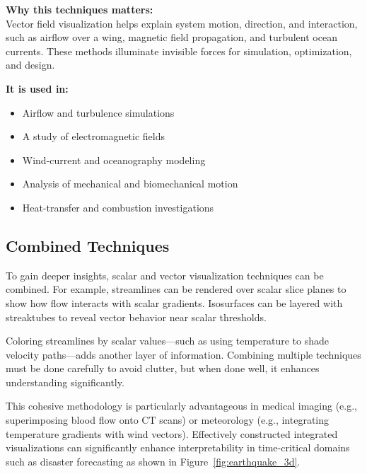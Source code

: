 \documentclass[11pt]{article}
\begin{document}
	
	\vspace{1em}
\noindent
\textbf{Why this techniques matters:} \\
Vector field visualization helps explain system motion, direction, and interaction, such as airflow over a wing, magnetic field propagation, and turbulent ocean currents. These methods illuminate invisible forces for simulation, optimization, and design.

\vspace{0.5em}
\noindent
\textbf{It is used in:}
\begin{itemize}
    \item Airflow and turbulence simulations
    \item A study of electromagnetic fields
    \item Wind-current and oceanography modeling
    \item Analysis of mechanical and biomechanical motion
    \item Heat-transfer and combustion investigations
\end{itemize}

	\subsection{Combined Techniques}
	To gain deeper insights, scalar and vector visualization techniques can be combined. For example, streamlines can be rendered over scalar slice planes to show how flow interacts with scalar gradients. Isosurfaces can be layered with streaktubes to reveal vector behavior near scalar thresholds.
	
	Coloring streamlines by scalar values—such as using temperature to shade velocity paths—adds another layer of information. Combining multiple techniques must be done carefully to avoid clutter, but when done well, it enhances understanding significantly.

	This cohesive methodology is particularly advantageous in medical imaging (e.g., superimposing blood flow onto CT scans) or meteorology (e.g., integrating temperature gradients with wind vectors). Effectively constructed integrated visualizations can significantly enhance interpretability in time-critical domains such as disaster forecasting as shown in Figure~\ref{fig:earthquake_3d}.
	
\end{document}
